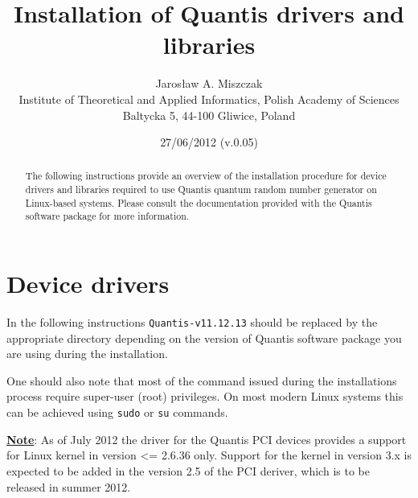 \documentclass[a4paper,11pt]{article}
\title{Installation of Quantis drivers and libraries}
\author{Jaros{\l}aw A. Miszczak\\
Institute of Theoretical and Applied Informatics, Polish Academy of Sciences\\
Baltycka 5, 44-100 Gliwice, Poland}
\date{27/06/2012 (v.0.05)}
\providecommand{\note}[1]{\noindent\textbf{\underline{Note}}: #1\vspace{6pt}}
\newcommand{\QuantisDistVersion}{Quantis-v11.12.13}
\begin{document}
\maketitle

\begin{abstract}
The following instructions provide an overview of the installation procedure for
device drivers and libraries required to use Quantis quantum random number
generator on Linux-based systems. Please consult the documentation provided with
the Quantis software package for more information.
\end{abstract}

\section{Device drivers}

In the following instructions \texttt{\QuantisDistVersion } should be replaced
by the appropriate directory depending on the version of Quantis software
package you are using during the installation.

One should also note that most of the command issued during the installations
process require super-user (root) privileges. On most modern Linux systems
this can be achieved using \texttt{sudo} or \texttt{su} commands.

\note{As of July 2012 the driver for the Quantis PCI devices provides a support
for Linux kernel in version <= 2.6.36 only. Support for the kernel in version
3.x is expected to be added in the version 2.5 of the PCI deriver, which is to
be released in summer 2012.}

\end{document}
